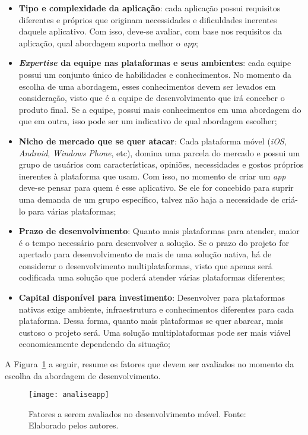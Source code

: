 \begin{itemize}
    \item \textbf{Tipo e complexidade da aplicação}: cada aplicação possui requisitos diferentes e próprios que originam necessidades e dificuldades inerentes daquele aplicativo. Com isso, deve-se avaliar,
    com base nos requisitos da aplicação, qual abordagem suporta melhor o \textit{app};
    \item \textbf{\textit{Expertise} da equipe nas plataformas e seus ambientes}: cada equipe possui um conjunto único de habilidades e conhecimentos. No momento da escolha de uma abordagem, esses conhecimentos
    devem ser levados em consideração, visto que é a equipe de desenvolvimento que irá conceber o produto final. Se a equipe, possui mais conhecimentos em uma abordagem do que em outra, isso pode ser 
    um indicativo de qual abordagem escolher;
    \item \textbf{Nicho de mercado que se quer atacar}: Cada plataforma móvel (\textit{iOS}, \textit{Android}, \textit{Windows Phone}, etc), domina uma parcela do mercado e possui um grupo de usuários com 
    características, opiniões, necessidades e gostos próprios inerentes à plataforma que usam. Com isso, no momento de criar um \textit{app} deve-se pensar para quem é esse aplicativo. Se ele for concebido 
    para suprir uma demanda de um grupo específico, talvez não haja a necessidade de criá-lo para várias plataformas;
    \item \textbf{Prazo de desenvolvimento}: Quanto mais plataformas para atender, maior é o tempo necessário para desenvolver a solução. Se o prazo do projeto for apertado para desenvolvimento de mais de uma solução 
    nativa, há de considerar o desenvolvimento multiplataformas, visto que apenas será codificada uma solução que poderá atender várias plataformas diferentes;
    \item \textbf{Capital disponível para investimento}: Desenvolver para plataformas nativas exige ambiente, infraestrutura e conhecimentos diferentes para cada plataforma. Dessa forma, quanto mais plataformas se 
    quer abarcar, mais custoso o projeto será. Uma solução multiplataformas pode ser mais viável economicamente dependendo da situação;
\end{itemize}

A Figura~\ref{fig:analiseapp} a seguir, resume os fatores que devem ser avaliados no momento da escolha da abordagem de desenvolvimento.
\begin{figure}[H]
  \centering
    \texttt{[image: analiseapp]}
    \caption[Fatores a serem avaliados no desenvolvimento móvel]{ Fatores a serem avaliados no desenvolvimento móvel. Fonte: Elaborado pelos autores.}
	\label{fig:analiseapp}
\end{figure}

